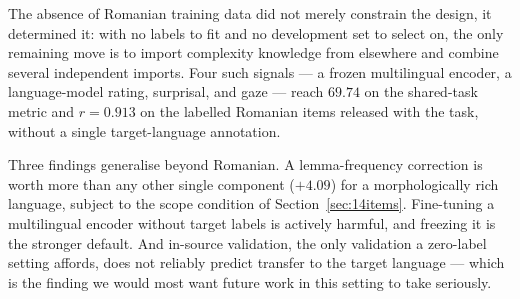 The absence of Romanian training data did not merely constrain the
design, it determined it: with no labels to fit and no development set
to select on, the only remaining move is to import complexity knowledge
from elsewhere and combine several independent imports. Four such
signals --- a frozen multilingual encoder, a language-model rating,
surprisal, and gaze --- reach $69.74$ on the shared-task metric and
$r = 0.913$ on the labelled Romanian items released with the task,
without a single target-language annotation.

Three findings generalise beyond Romanian. A lemma-frequency correction
is worth more than any other single component ($+4.09$) for a
morphologically rich language, subject to the scope condition of
Section~\ref{sec:14items}. Fine-tuning a multilingual encoder without
target labels is actively harmful, and freezing it is the stronger
default. And in-source validation, the only validation a zero-label
setting affords, does not reliably predict transfer to the target
language --- which is the finding we would most want future work in
this setting to take seriously.

